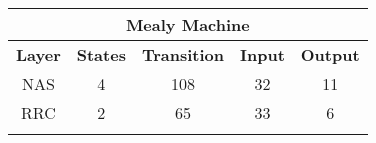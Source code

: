 \begin{table}[h!]
  \centering
\begin{tabular}{ccccc}
\hline
\multicolumn{5}{|c|}{\textbf{Mealy Machine}}                                                                                                                                                                       \\ \hline
\multicolumn{1}{|c|}{\textbf{Layer}} & \multicolumn{1}{c|}{\textbf{States}}            & \multicolumn{1}{c|}{\textbf{Transition}}  & \multicolumn{1}{c|}{\textbf{Input}}    & \multicolumn{1}{c|}{\textbf{Output}} \\ \hline
\multicolumn{1}{|c|}{NAS}            & \multicolumn{1}{c|}{4}                          & \multicolumn{1}{c|}{108}                  & \multicolumn{1}{c|}{32}                & \multicolumn{1}{c|}{11}              \\ \hline
\multicolumn{1}{|c|}{RRC}            & \multicolumn{1}{c|}{2}                          & \multicolumn{1}{c|}{65}                   & \multicolumn{1}{c|}{33}                & \multicolumn{1}{c|}{6}               \\ \hline
                                     &                                                 &                                           &                                        &                                      \\ \cline{1-4}



\end{tabular}
\end{table}
